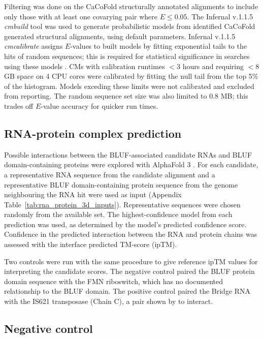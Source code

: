 Filtering was done on the CaCoFold structurally annotated alignments to include only those with at least one covarying pair where $E \le 0.05$.
The Infernal v.1.1.5 \emph{cmbuild} tool was used to generate probabilistic models from identified CaCoFold generated structural alignments, using default parameters.
Infernal v.1.1.5 \emph{cmcalibrate} assigns $E$-values to built models by fitting exponential tails to the hits of random sequences; this is required for statistical significance in searches using these models \citep{Nawrocki2013}.
\acp{CM} with calibration runtimes $< 3$ hours and requiring $< 8$ \ac{GB} space on 4 \ac{CPU} cores were calibrated by fitting the null tail from the top 5\% of the histogram.
Models exceding these limits were not calibrated and excluded from reporting.
The random sequence set size was also limited to 0.8 \ac{MB}; this trades off $E$-value accuracy for quicker run times.

\subsection{RNA-protein complex prediction}
\label{sec:alphafold}

Possible interactions between the \ac{BLUF}-associated candidate RNAs and \ac{BLUF} domain-containing proteins were explored with AlphaFold 3 \citep{Abramson2024}.
For each candidate, a representative RNA sequence from the candidate alignment and a representative \ac{BLUF} domain-containing protein sequence from the genome neighbouring the RNA hit were used as input (Appendix Table~\ref{tab:rna_protein_3d_inputs}).
Representative sequences were chosen randomly from the available set.
The highest-confidence model from each prediction was used, as determined by the model's predicted confidence score.
Confidence in the predicted interaction between the RNA and protein chains was assessed with the interface predicted TM-score (\ac{ipTM}).

Two controls were run with the same procedure to give reference \ac{ipTM} values for interpreting the candidate scores.
The negative control paired the \ac{BLUF} protein domain sequence with the \ac{FMN} riboswitch, which has no documented relationship to the \ac{BLUF} domain.
The positive control paired the Bridge RNA with the IS621 transposase (Chain C), a pair shown by \citet{Durrant2024} to interact.

\subsection{Negative control}
\label{sec:negative-control}

